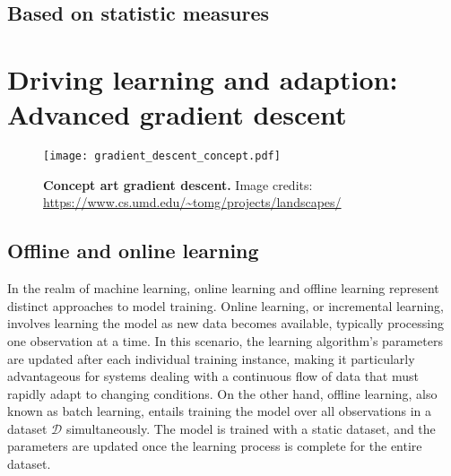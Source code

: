 \subsection{Based on statistic measures}


\section{Driving learning and adaption: Advanced gradient descent}
\begin{figure}[t!]
	\begin{center}
		\texttt{[image: gradient\_descent\_concept.pdf]}
	\end{center}
	\caption{\textbf{Concept art gradient descent.} Image credits: \url{https://www.cs.umd.edu/~tomg/projects/landscapes/}}
\end{figure}
\subsection{Offline and online learning}
In the realm of machine learning, online learning and offline learning represent distinct approaches to model training. Online learning, or incremental learning, involves learning the model as new data becomes available, typically processing one observation at a time. In this scenario, the learning algorithm's parameters are updated after each individual training instance, making it particularly advantageous for systems dealing with a continuous flow of data that must rapidly adapt to changing conditions. On the other hand, offline learning, also known as batch learning, entails training the model over all observations in a dataset $\mathcal{D}$ simultaneously. The model is trained with a static dataset, and the parameters are updated once the learning process is complete for the entire dataset. %

